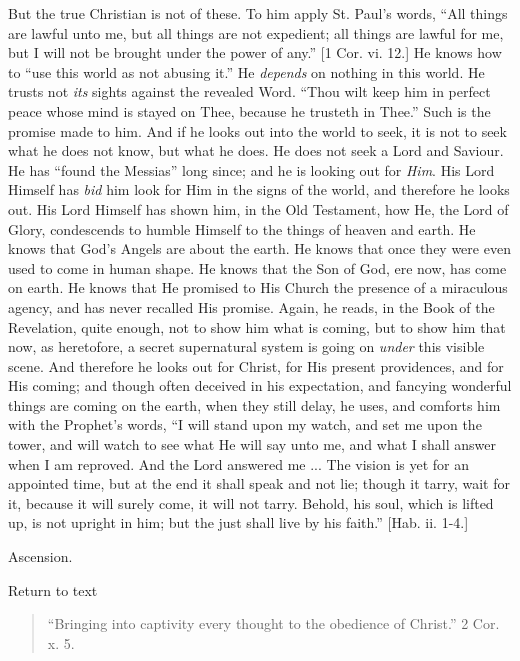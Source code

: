 But the true Christian is not of these. To him apply St. Paul's
words, ``All things are lawful unto me, but all things are not
expedient; all things are lawful for me, but I will not be brought
under the power of any.'' [1 Cor. vi. 12.] He knows how to
``use this world as not abusing it.'' He \emph{depends} on
nothing in this world. He trusts not \emph{its} sights against the
revealed Word. ``Thou wilt keep him in perfect peace whose mind is
stayed on Thee, because he trusteth in Thee.'' Such is the promise
made to him. And if he looks out into the world to seek, it is not to
seek what he does not know, but what he does. He does not seek a Lord
and Saviour. He has ``found the Messias'' long since; and he
is looking out for \emph{Him}. His Lord Himself has \emph{bid} him
look for Him in the signs of the world, and therefore he looks out.
His Lord Himself has shown him, in the Old Testament, how He, the Lord
of Glory, condescends to humble Himself to the things of heaven and
earth. He knows that God's Angels are about the earth. He knows that
once they were even used to come in human shape. He knows that the Son
of God, ere now, has come on earth. He knows that He promised to His
Church the presence of a miraculous agency, and has never recalled His
promise. Again, he reads, in the Book of the Revelation, quite enough,
not to show him what is coming, but to show him that now, as
heretofore, a secret supernatural system is going on \emph{under} this
visible scene. And therefore he looks out for Christ, for His present
providences, and for His coming; and though often deceived in his
expectation, and fancying wonderful things are coming on the earth,
when they still delay, he uses, and comforts him with the Prophet's
words, ``I will stand upon my watch, and set me upon the tower,
and will watch to see what He will say unto me, and what I shall
answer when I am reproved. And the Lord answered me ... The vision is
yet for an appointed time, but at the end it shall speak and not lie;
though it tarry, wait for it, because it will surely come, it will not
tarry. Behold, his soul, which is lifted up, is not upright in him;
but the just shall live by his faith.'' [Hab. ii. 1-4.]


Ascension.

Return to text


\begin{quote}

``Bringing into captivity every thought to the obedience of
Christ.'' 2 Cor. x. 5.

\end{quote}

